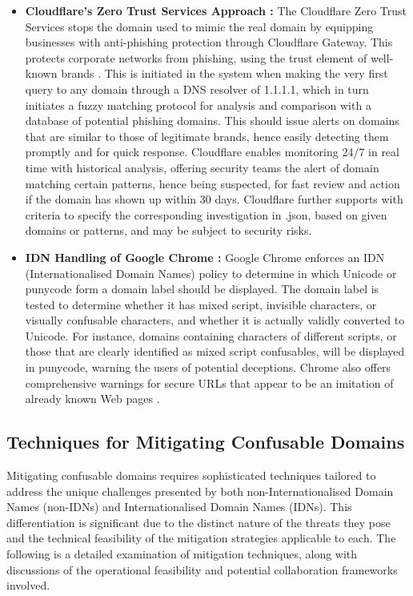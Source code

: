 \begin{itemize}
    \item \textbf{Cloudflare's Zero Trust Services Approach :} The Cloudflare Zero Trust Services stops the domain used to mimic the real domain by equipping businesses with anti-phishing protection through Cloudflare Gateway. This protects corporate networks from phishing, using the trust element of well-known brands \cite{Cloudflare2023}. This is initiated in the system when making the very first query to any domain through a DNS resolver of 1.1.1.1, which in turn initiates a fuzzy matching protocol for analysis and comparison with a database of potential phishing domains. This should issue alerts on domains that are similar to those of legitimate brands, hence easily detecting them promptly and for quick response. Cloudflare enables monitoring 24/7 in real time with historical analysis, offering security teams the alert of domain matching certain patterns, hence being suspected, for fast review and action if the domain has shown up within 30 days. Cloudflare further supports with criteria to specify the corresponding investigation in .json, based on given domains or patterns, and may be subject to security risks.

     \item \textbf{IDN Handling of Google Chrome : }Google Chrome enforces an IDN (Internationalised Domain Names) policy to determine in which Unicode or punycode form a domain label should be displayed. The domain label is tested to determine whether it has mixed script, invisible characters, or visually confusable characters, and whether it is actually validly converted to Unicode. For instance, domains containing characters of different scripts, or those that are clearly identified as mixed script confusables, will be displayed in punycode, warning the users of potential deceptions. Chrome also offers comprehensive warnings for secure URLs that appear to be an imitation of already known Web pages \cite{ChromiumIDN}.
     
\end{itemize}

\subsection{Techniques for Mitigating Confusable Domains}

Mitigating confusable domains requires sophisticated techniques tailored to address the unique challenges presented by both non-Internationalised Domain Names (non-IDNs) and Internationalised Domain Names (IDNs). This differentiation is significant due to the distinct nature of the threats they pose and the technical feasibility of the mitigation strategies applicable to each. The following is a detailed examination of mitigation techniques, along with discussions of the operational feasibility and potential collaboration frameworks involved.

